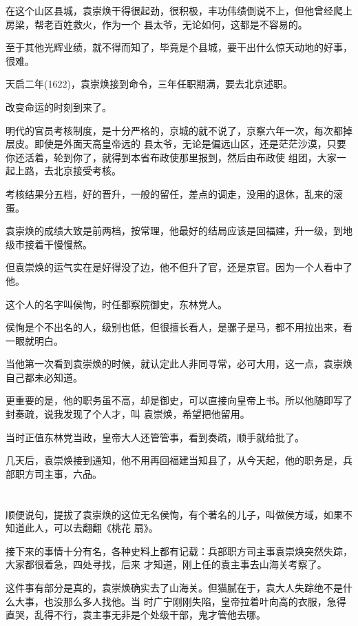 \documentclass[11pt,a4paper,onecolumn]{article}
\begin{document}
在这个山区县城，袁崇焕干得很起劲，很积极，丰功伟绩倒说不上，但他曾经爬上房梁，帮老百姓救火，作为一个
县太爷，无论如何，这都是不容易的。

至于其他光辉业绩，就不得而知了，毕竟是个县城，要干出什么惊天动地的好事，很难。

天启二年(1622)，袁崇焕接到命令，三年任职期满，要去北京述职。

改变命运的时刻到来了。

明代的官员考核制度，是十分严格的，京城的就不说了，京察六年一次，每次都掉层皮。即使是外面天高皇帝远的
县太爷，无论是偏远山区，还是茫茫沙漠，只要你还活着，轮到你了，就得到本省布政使那里报到，然后由布政使
组团，大家一起上路，去北京接受考核。

考核结果分五档，好的晋升，一般的留任，差点的调走，没用的退休，乱来的滚蛋。

袁崇焕的成绩大致是前两档，按常理，他最好的结局应该是回福建，升一级，到地级市接着干慢慢熬。

但袁崇焕的运气实在是好得没了边，他不但升了官，还是京官。因为一个人看中了他。

这个人的名字叫侯恂，时任都察院御史，东林党人。

侯恂是个不出名的人，级别也低，但很擅长看人，是骡子是马，都不用拉出来，看一眼就明白。

当他第一次看到袁崇焕的时候，就认定此人非同寻常，必可大用，这一点，袁崇焕自己都未必知道。

更重要的是，他的职务虽不高，却是御史，可以直接向皇帝上书。所以他随即写了封奏疏，说我发现了个人才，叫
袁崇焕，希望把他留用。

当时正值东林党当政，皇帝大人还管管事，看到奏疏，顺手就给批了。

几天后，袁崇焕接到通知，他不用再回福建当知县了，从今天起，他的职务是，兵部职方司主事，六品。

\section[\thesection]{}

顺便说句，提拔了袁崇焕的这位无名侯恂，有个著名的儿子，叫做侯方域，如果不知道此人，可以去翻翻《桃花
扇》。

接下来的事情十分有名，各种史料上都有记载：兵部职方司主事袁崇焕突然失踪，大家都很着急，四处寻找，后来
才知道，刚上任的袁主事去山海关考察了。

这件事有部分是真的，袁崇焕确实去了山海关。但猫腻在于，袁大人失踪绝不是什么大事，也没那么多人找他。当
时广宁刚刚失陷，皇帝拉着叶向高的衣服，急得直哭，乱得不行，袁主事无非是个处级干部，鬼才管他去哪。
\end{document}
